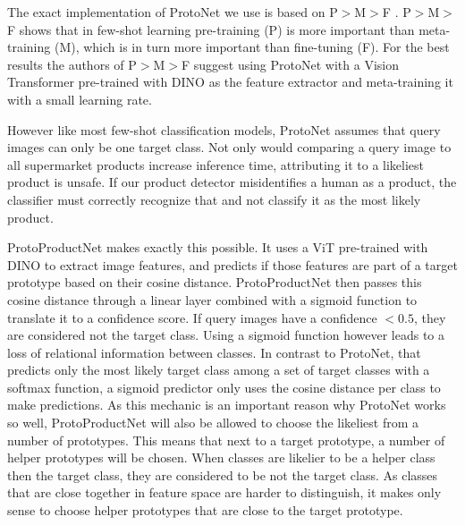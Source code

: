 The exact implementation of ProtoNet we use is based on P$>$M$>$F \cite{pmf_2022}. P$>$M$>$F shows that in few-shot learning pre-training (P) is more important than meta-training (M), which is in turn more important than fine-tuning (F). For the best results the authors of P$>$M$>$F suggest using ProtoNet with a Vision Transformer pre-trained with DINO \cite{dino_2021} as the feature extractor and meta-training it with a small learning rate.

However like most few-shot classification models, ProtoNet assumes that query images can only be one  target class. Not only would comparing a query image to all supermarket products increase inference time, attributing it to a likeliest product is unsafe. If our product detector misidentifies a human as a product, the classifier must correctly recognize that and not classify it as the most likely product.

ProtoProductNet makes exactly this possible. It uses a ViT pre-trained with DINO to extract image features, and predicts if those features are part of a target prototype based on their cosine distance. ProtoProductNet then passes this cosine distance through a linear layer combined with a sigmoid function to translate it to a confidence score. If query images have a confidence $<0.5$, they are considered not the target class. Using a sigmoid function however leads to a loss of relational information between classes. In contrast to ProtoNet, that predicts only the most likely target class among a set of target classes with a softmax function, a sigmoid predictor only uses the cosine distance per class to make predictions. As this mechanic is an important reason why ProtoNet works so well, ProtoProductNet will also be allowed to choose the likeliest from a number of prototypes. This means that next to a target prototype, a number of helper prototypes will be chosen. When classes are likelier to be a helper class then the target class, they are considered to be not the target class. As classes that are close together in feature space are harder to distinguish, it makes only sense to choose helper prototypes that are close to the target prototype.



